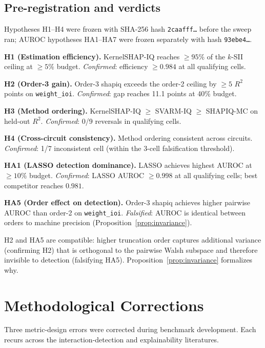 \documentclass[10pt]{article}
\begin{document}
\subsection{Pre-registration and verdicts}

Hypotheses H1--H4 were frozen with SHA-256 hash
\texttt{2caafff\ldots} before the sweep ran; AUROC hypotheses
HA1--HA7 were frozen separately with hash \texttt{93ebe4\ldots}.

\textbf{H1 (Estimation efficiency).} KernelSHAP-IQ reaches
$\geq 95\%$ of the $k$-SII ceiling at $\geq 5\%$ budget.
\emph{Confirmed}: efficiency $\geq 0.984$ at all qualifying cells.

\textbf{H2 (Order-3 gain).} Order-3 shapiq exceeds the order-2
ceiling by $\geq 5$ $R^2$ points on \texttt{weight\_ioi}.
\emph{Confirmed}: gap reaches 11.1 points at 40\% budget.

\textbf{H3 (Method ordering).} KernelSHAP-IQ $\geq$ SVARM-IQ
$\geq$ SHAPIQ-MC on held-out $R^2$.
\emph{Confirmed}: 0/9 reversals in qualifying cells.

\textbf{H4 (Cross-circuit consistency).} Method ordering consistent
across circuits.
\emph{Confirmed}: 1/7 inconsistent cell (within the 3-cell
falsification threshold).

\textbf{HA1 (LASSO detection dominance).} LASSO achieves highest
AUROC at $\geq 10\%$ budget.
\emph{Confirmed}: LASSO AUROC $\geq 0.998$ at all qualifying cells;
best competitor reaches $0.981$.

\textbf{HA5 (Order effect on detection).} Order-3 shapiq achieves
higher pairwise AUROC than order-2 on \texttt{weight\_ioi}.
\emph{Falsified}: AUROC is identical between orders to machine
precision (Proposition~\ref{prop:invariance}).

H2 and HA5 are compatible: higher truncation order captures
additional variance (confirming H2) that is orthogonal to the
pairwise Walsh subspace and therefore invisible to detection
(falsifying HA5). Proposition~\ref{prop:invariance} formalizes why.


\section{Methodological Corrections}
\label{sec:audit}

Three metric-design errors were corrected during benchmark
development. Each recurs across the interaction-detection and
explainability literatures.
\end{document}

